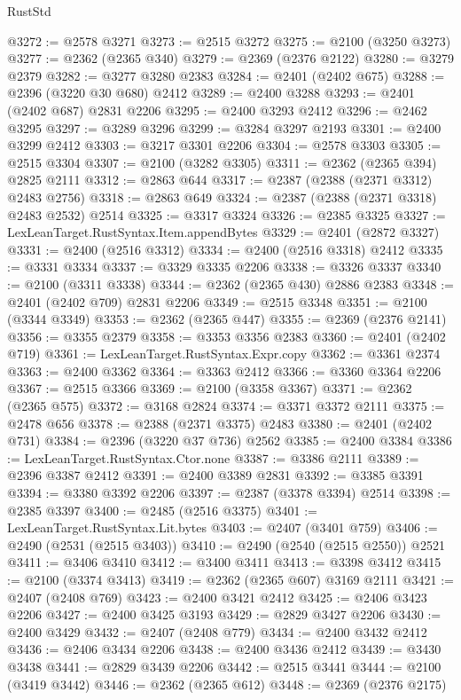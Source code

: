 \begin{lexlean}{RustStd}
\begin{coremodule}
@3272 := @2578 @3271
@3273 := @2515 @3272
@3275 := @2100 (@3250 @3273)
@3277 := @2362 (@2365 @340)
@3279 := @2369 (@2376 @2122)
@3280 := @3279 @2379
@3282 := @3277 @3280 @2383
@3284 := @2401 (@2402 @675)
@3288 := @2396 (@3220 @30 @680) @2412
@3289 := @2400 @3288
@3293 := @2401 (@2402 @687) @2831 @2206
@3295 := @2400 @3293 @2412
@3296 := @2462 @3295
@3297 := @3289 @3296
@3299 := @3284 @3297 @2193
@3301 := @2400 @3299 @2412
@3303 := @3217 @3301 @2206
@3304 := @2578 @3303
@3305 := @2515 @3304
@3307 := @2100 (@3282 @3305)
@3311 := @2362 (@2365 @394) @2825 @2111
@3312 := @2863 @644
@3317 := @2387 (@2388 (@2371 @3312) @2483 @2756)
@3318 := @2863 @649
@3324 := @2387 (@2388 (@2371 @3318) @2483 @2532) @2514
@3325 := @3317 @3324
@3326 := @2385 @3325
@3327 := LexLeanTarget.RustSyntax.Item.appendBytes
@3329 := @2401 (@2872 @3327)
@3331 := @2400 (@2516 @3312)
@3334 := @2400 (@2516 @3318) @2412
@3335 := @3331 @3334
@3337 := @3329 @3335 @2206
@3338 := @3326 @3337
@3340 := @2100 (@3311 @3338)
@3344 := @2362 (@2365 @430) @2886 @2383
@3348 := @2401 (@2402 @709) @2831 @2206
@3349 := @2515 @3348
@3351 := @2100 (@3344 @3349)
@3353 := @2362 (@2365 @447)
@3355 := @2369 (@2376 @2141)
@3356 := @3355 @2379
@3358 := @3353 @3356 @2383
@3360 := @2401 (@2402 @719)
@3361 := LexLeanTarget.RustSyntax.Expr.copy
@3362 := @3361 @2374
@3363 := @2400 @3362
@3364 := @3363 @2412
@3366 := @3360 @3364 @2206
@3367 := @2515 @3366
@3369 := @2100 (@3358 @3367)
@3371 := @2362 (@2365 @575)
@3372 := @3168 @2824
@3374 := @3371 @3372 @2111
@3375 := @2478 @656
@3378 := @2388 (@2371 @3375) @2483
@3380 := @2401 (@2402 @731)
@3384 := @2396 (@3220 @37 @736) @2562
@3385 := @2400 @3384
@3386 := LexLeanTarget.RustSyntax.Ctor.none
@3387 := @3386 @2111
@3389 := @2396 @3387 @2412
@3391 := @2400 @3389 @2831
@3392 := @3385 @3391
@3394 := @3380 @3392 @2206
@3397 := @2387 (@3378 @3394) @2514
@3398 := @2385 @3397
@3400 := @2485 (@2516 @3375)
@3401 := LexLeanTarget.RustSyntax.Lit.bytes
@3403 := @2407 (@3401 @759)
@3406 := @2490 (@2531 (@2515 @3403))
@3410 := @2490 (@2540 (@2515 @2550)) @2521
@3411 := @3406 @3410
@3412 := @3400 @3411
@3413 := @3398 @3412
@3415 := @2100 (@3374 @3413)
@3419 := @2362 (@2365 @607) @3169 @2111
@3421 := @2407 (@2408 @769)
@3423 := @2400 @3421 @2412
@3425 := @2406 @3423 @2206
@3427 := @2400 @3425 @3193
@3429 := @2829 @3427 @2206
@3430 := @2400 @3429
@3432 := @2407 (@2408 @779)
@3434 := @2400 @3432 @2412
@3436 := @2406 @3434 @2206
@3438 := @2400 @3436 @2412
@3439 := @3430 @3438
@3441 := @2829 @3439 @2206
@3442 := @2515 @3441
@3444 := @2100 (@3419 @3442)
@3446 := @2362 (@2365 @612)
@3448 := @2369 (@2376 @2175)

\end{coremodule}
\end{lexlean}

